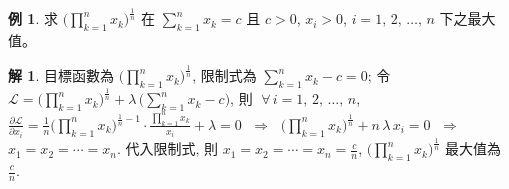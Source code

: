 \documentclass[12pt]{extarticle}
\newcommand{\ds}{\displaystyle}
\newcommand{\ie}{\;\Longrightarrow\;}
\theoremstyle{definition}
\newtheorem*{ex}{例}
\newtheorem*{sol}{解}
\begin{document}
\begin{ex}
  求 $\ds\Big(\prod_{k = 1}^n x_k\Big)^{\frac{1}{n}}$ 在 $\ds\sum_{k = 1}^n x_k = c$ 且 $c > 0$, $x_i > 0$, $i = 1,\,2,\,\ldots,\,n$ 下之最大值。 
\end{ex}

\begin{sol}
  目標函數為 $\ds\Big(\prod_{k = 1}^n x_k\Big)^{\frac{1}{n}}$, 限制式為 $\ds\sum_{k = 1}^n x_k - c = 0$; 令 $\ds\mathcal{L} = \Big(\prod_{k = 1}^n x_k\Big)^{\frac{1}{n}} + \lambda\,\Big(\sum_{k = 1}^n x_k - c\Big)$, 則 $\;\forall\,i = 1,\,2,\,\ldots,\,n$, $\ds\frac{\partial\mathcal{L}}{\partial x_i} = \frac{1}{n}\Big(\prod_{k = 1}^n x_k\Big)^{\frac{1}{n} - 1}\cdot\frac{\prod_{k = 1}^n x_k}{x_i} + \lambda = 0$ $\ie$ $\ds\Big(\prod_{k = 1}^n x_k\Big)^{\frac{1}{n}} + n\,\lambda\,x_i = 0$ $\ie$ $x_1 = x_2 = \cdots = x_n$. 代入限制式, 則 $\ds x_1 = x_2 = \cdots = x_n = \frac{c}{n}$, $\ds\Big(\prod_{k = 1}^n x_k\Big)^{\frac{1}{n}}$ 最大值為 $\ds\frac{c}{n}$. 
\end{sol}

\end{document}

